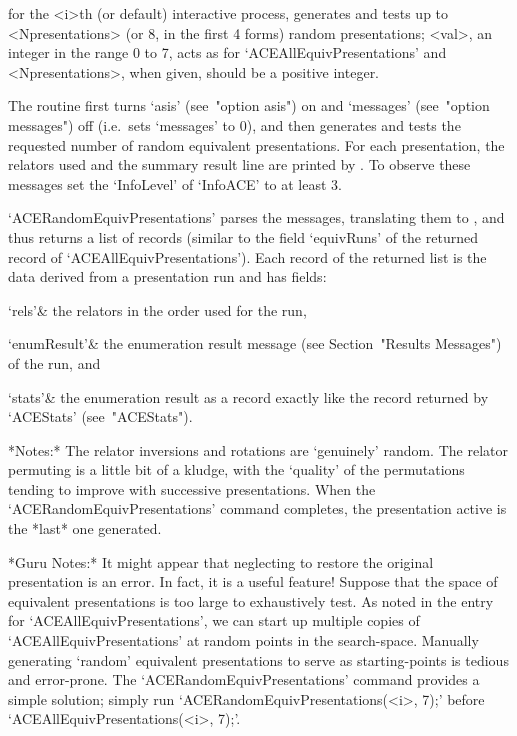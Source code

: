 for the <i>th (or default) interactive {\ACE} process,  generates  and
tests up to <Npresentations> (or 8,  in  the  first  4  forms)  random
presentations; <val>, an integer in the range 0  to  7,  acts  as  for
`ACEAllEquivPresentations' and <Npresentations>, when given, should be
a positive integer.

The routine first turns `asis' (see~"option asis") on  and  `messages'
(see~"option messages") off (i.e.~sets  `messages'  to  0),  and  then
generates  and  tests  the  requested  number  of  random   equivalent
presentations. For  each  presentation,  the  relators  used  and  the
summary result line are printed by {\ACE}. To observe these messages set
the `InfoLevel' of `InfoACE' to at least 3. 

`ACERandomEquivPresentations' parses the {\ACE} messages,  translating
them to {\GAP}, and thus returns a list of  records  (similar  to  the
field     `equivRuns'     of     the      returned      record      of
`ACEAllEquivPresentations'). Each record of the returned list  is  the
data derived from a presentation run and has fields:

\beginitems

\quad`rels'& the relators in the order used for the run,

\quad`enumResult'&  the  {\ACE}  enumeration   result   message   (see
Section~"Results Messages") of the run, and

\quad`stats'& the enumeration result as a {\GAP} record  exactly  like
the record returned by `ACEStats' (see~"ACEStats").

\enditems

*Notes:*
The relator inversions and rotations are \lq{}genuinely'  random.  The
relator permuting is a little bit of a kludge, with the  \lq{}quality'
of the permutations tending to improve with successive  presentations.
When  the   `ACERandomEquivPresentations'   command   completes,   the
presentation active is the *last* one generated.

*Guru Notes:*
It might appear that neglecting to restore the  original  presentation
is an error. In fact, it is a useful feature! Suppose that  the  space
of equivalent presentations is too  large  to  exhaustively  test.  As
noted in the entry for `ACEAllEquivPresentations',  we  can  start  up
multiple copies of `ACEAllEquivPresentations' at random points in  the
search-space. Manually generating `random' equivalent presentations to
serve   as   starting-points   is   tedious   and   error-prone.   The
`ACERandomEquivPresentations'  command  provides  a  simple  solution;
simply    run    `ACERandomEquivPresentations(<i>,     7);'     before
`ACEAllEquivPresentations(<i>, 7);'.


